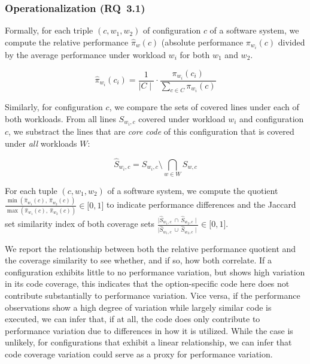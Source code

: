 

\subsubsection{Operationalization (RQ~3.1)} Formally, for each triple $(c, w_1, w_2)$ of configuration $c$ of a software system, we compute the relative performance $\hat{\pi}_{w}(c)$ (absolute performance $\pi_{w_i}(c)$ divided by the average performance under workload $w_i$ for both $w_1$ and $w_2$. 

\begin{equation}
	\hat{\pi}_{w_i}(c_i) =  \frac{1}{\mid C \mid} \cdot \frac{\pi_{w_i}(c_i)}{\sum_{c\in C} \pi_{w_i}(c)}
\end{equation}

Similarly, for configuration $c$, we compare the sets of covered lines under each of both workloads. From all lines $S_{w_i, c}$ covered under workload $w_i$ and configuration $c$, we substract the lines that are \emph{core code} of this configuration that is covered under \emph{all} workloads $W$:

\begin{equation}
\hat{S}_{w_i, c}	 = S_{w_i, c} \setminus \bigcap_{w\in W} S_{w, c}
\end{equation}

For each tuple $(c, w_1, w_2)$ of a software system, we compute the quotient $\frac{ \min(\hat{\pi}_{w_1}(c),~ \hat{\pi}_{w_2}(c)) }{ \max(\hat{\pi}_{w_1}(c),~\hat{\pi}_{w_2}(c)) } \in \lbrack 0,1\rbrack$ to indicate performance differences and the Jaccard set similarity index of both coverage sets $\frac{\mid\hat{S}_{w_1, c}~\cap~ \hat{S}_{w_2, c}\mid}{\mid\hat{S}_{w_1, c}~\cup~\hat{S}_{w_2, c}\mid} \in \lbrack 0,1 \rbrack$. 

We report the relationship between both the relative performance quotient and the coverage similarity to see whether, and if so, how both correlate. If a configuration exhibits little to no performance variation, but shows high variation in its code coverage, this indicates that the option-specific code here does not contribute substantially to performance variation. Vice versa, if the performance observations show a high degree of variation while largely similar code is executed, we can infer that, if at all, the code does only contribute to performance variation due to differences in how it is utilized. While the case is unlikely, for configurations that exhibit a linear relationship, we can infer that code coverage variation could serve as a proxy for performance variation. 

